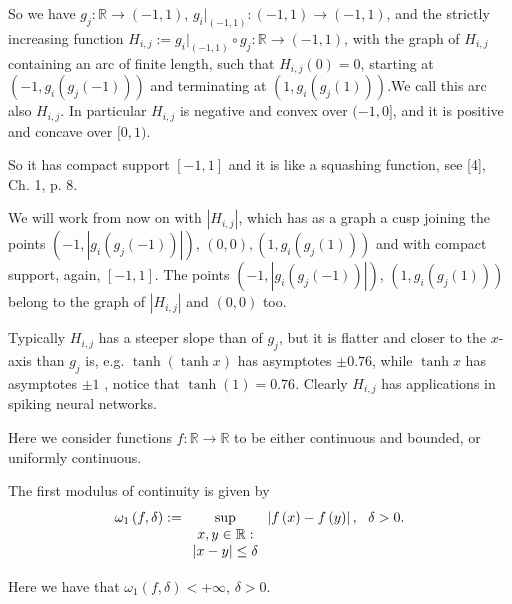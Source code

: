 \documentclass[10pt]{NSP1}
\numberwithin{equation}{section}
\begin{document}
So we have $g_{j}:\mathbb{R}\rightarrow \left( -1,1\right) $, $%
g_{i}|_{\left( -1,1\right) }:\left( -1,1\right) \rightarrow \left(
-1,1\right) $, and the strictly increasing function $H_{i,j}:=g_{i}|_{\left(
-1,1\right) }\circ g_{j}:\mathbb{R}\rightarrow \left( -1,1\right) $, with
the graph of $H_{i,j}$ containing an arc of finite length, such that $%
H_{i,j}\left( 0\right) =0$, starting at $\left( -1,g_{i}\left( g_{j}\left(
-1\right) \right) \right) $ and terminating at $\left( 1,g_{i}\left(
g_{j}\left( 1\right) \right) \right) .$We call this arc also $H_{i,j}$. In
particular $H_{i,j}$ is negative and convex over $(-1,0]$, and it is
positive and concave over $[0,1)$.

So it has compact support $\left[ -1,1\right] $ and it is like a squashing
function, see [4], Ch. 1, p. 8.

We will work from now on with $\left \vert H_{i,j}\right \vert $, which has
as a graph a cusp joining the points $\left( -1,\left \vert g_{i}\left(
g_{j}\left( -1\right) \right) \right \vert \right) $, $\left( 0,0\right)
,\left( 1,g_{i}\left( g_{j}\left( 1\right) \right) \right) $ and with
compact support, again, $\left[ -1,1\right] $. The points $\left(
-1,\left
\vert g_{i}\left( g_{j}\left( -1\right) \right) \right \vert
\right) $, $\left( 1,g_{i}\left( g_{j}\left( 1\right) \right) \right) $
belong to the graph of $\left \vert H_{i,j}\right \vert $ and $\left(
0,0\right) $ too.

Typically $H_{i,j}$ has a steeper slope than of $g_{j}$, but it is flatter
and closer to the $x$-axis than $g_{j}$ is, e.g. $\tanh \left( \tanh
x\right) $ has asymptotes $\pm 0.76$, while $\tanh x$ has asymptotes $\pm 1$
, notice that $\tanh \left( 1\right) =0.76$. Clearly $H_{i,j}$ has
applications in spiking neural networks.

Here we consider functions $f:\mathbb{R}\rightarrow \mathbb{R}$ to be either
continuous and bounded, or uniformly continuous.

The first modulus of continuity is given by
\begin{equation*}
\omega _{1}\left( f,\delta \right) :=\underset{%
\begin{array}{c}
x,y\in \mathbb{R}: \\
\left \vert x-y\right \vert \leq \delta%
\end{array}%
}{\sup }\left \vert f\left( x\right) -f\left( y\right) \right \vert ,\text{
\ }\delta >0.
\end{equation*}

Here we have that $\omega _{1}\left( f,\delta \right) <+\infty $, $\delta
>0. $
\end{document}
